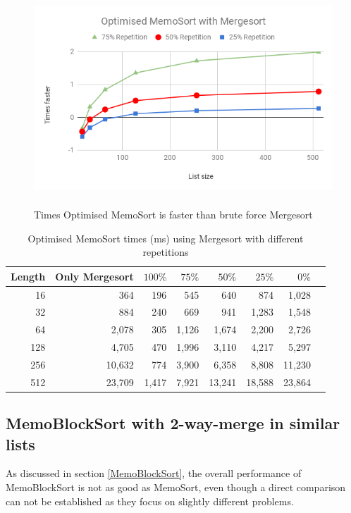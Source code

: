 \documentclass[a4paper,12pt]{article}
\begin{document}
\begin{figure}[H]
    \centering
    \includegraphics[height=8cm,keepaspectratio]{./images/OptMemoSortMerge.png}
    \caption{Times Optimised MemoSort is faster than brute force Mergesort}
    \label{fig:OptMemoSortMergeGraph}
\end{figure}


\begin{table}[H]
\centering
\begin{tabular}{|r|r|r|r|r|r|r|r|}   \hline
	{Length} & {Only Mergesort} & {$100\%$} & {$75\%$} & {$50\%$} & {$25\%$} & {$0\%$} \\  \hline
	16 &364&196&545 & 640 &874&1,028\\ 
	32 &884&240&669 & 941&1,283&1,548\\ 
	64 &2,078&305 &1,126&1,674&2,200&2,726\\ 
	128 &4,705&470&1,996&3,110&4,217&5,297\\ 
	256 &10,632&774&3,900&6,358&8,808&11,230\\ 
	512 &23,709& 1,417&7,921&13,241&18,588&23,864\\  \hline
\end{tabular}
\caption{Optimised MemoSort times (ms) using Mergesort with different repetitions}
\label{fig:OptMemoSortMergeTable}
\end{table}

\subsection{MemoBlockSort with 2-way-merge in similar lists}\label{MemoBlock2Res}

As discussed in section \ref{MemoBlockSort}, the overall performance of MemoBlockSort is not as good as MemoSort, even though a direct comparison can not be established as they focus on slightly different problems. \\
\end{document}
